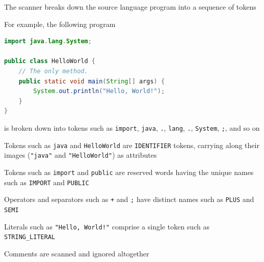 \documentclass[8pt,a4paper,compress]{beamer}
\begin{document}
\begin{frame}[fragile]
\pause\transdissolve

The scanner breaks down the source language program into a sequence of tokens

\pause\transdissolve\bigskip

For example, the following program

\pause\transdissolve\smallskip

\begin{lstlisting}[language=Java,style=focusin]
import java.lang.System;

public class HelloWorld {
    // The only method.
    public static void main(String[] args) {
        System.out.println("Hello, World!");
    }
}
\end{lstlisting}

\pause\transdissolve\smallskip

is broken down into tokens such as \lstinline{import}, \lstinline{java}, \lstinline{.}, \lstinline{lang}, \lstinline{.}, \lstinline{System}, \lstinline{;}, and so on

\pause\transdissolve\bigskip

Tokens such as \lstinline{java} and \lstinline{HelloWorld} are \lstinline{IDENTIFIER} tokens, carrying along their images (\lstinline{"java"} and \lstinline{"HelloWorld"}) as attributes

\pause\transdissolve\bigskip

Tokens such as \lstinline{import} and \lstinline{public} are reserved words having the unique names such as \lstinline{IMPORT} and \lstinline{PUBLIC}

\pause\transdissolve\bigskip

Operators and separators such as \lstinline{+} and \lstinline{;} have distinct names such as \lstinline{PLUS} and \lstinline{SEMI}

\pause\transdissolve\bigskip

Literals such as \lstinline{"Hello, World!"} comprise a single token such as \lstinline{STRING_LITERAL}

\pause\transdissolve\bigskip

Comments are scanned and ignored altogether
\end{frame}
\end{document}
